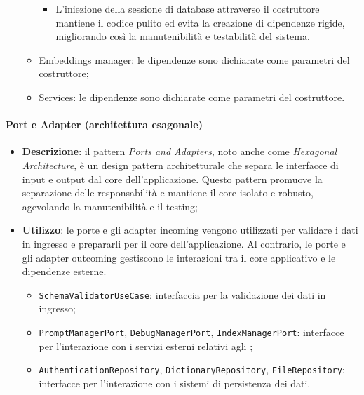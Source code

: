 \begin{itemize}
\begin{itemize}
\begin{itemize}
            \item L'iniezione della sessione di database attraverso il costruttore mantiene il codice pulito ed evita la creazione di dipendenze rigide, migliorando così la manutenibilità e testabilità del sistema.
        \end{itemize}
        \item Embeddings manager: le dipendenze sono dichiarate come parametri del costruttore;
        \item Services: le dipendenze sono dichiarate come parametri del costruttore.
    \end{itemize}
\end{itemize}

\paragraph{Port e Adapter (architettura esagonale)}
\begin{itemize}
    \item \textbf{Descrizione}: il pattern \textit{Ports and Adapters}, noto anche come \textit{Hexagonal Architecture}, è un design pattern architetturale che separa le interfacce di input e output dal core dell'applicazione. Questo pattern promuove la separazione delle responsabilità e mantiene il core isolato e robusto, agevolando la manutenibilità e il testing;
    \item \textbf{Utilizzo}: le porte e gli adapter incoming vengono utilizzati per validare i dati in ingresso e prepararli per il core dell'applicazione. Al contrario, le porte e gli adapter outcoming gestiscono le interazioni tra il core applicativo e le dipendenze esterne.
    \begin{itemize}
        \item \texttt{SchemaValidatorUseCase}: interfaccia per la validazione dei dati in ingresso;
        \item \texttt{PromptManagerPort}, \texttt{DebugManagerPort}, \texttt{IndexManagerPort}: interfacce per l'interazione con i servizi esterni relativi agli ;
        \item \texttt{AuthenticationRepository}, \texttt{DictionaryRepository}, \texttt{FileRepository}: interfacce per l'interazione con i sistemi di persistenza dei dati.
    \end{itemize}
\end{itemize}

